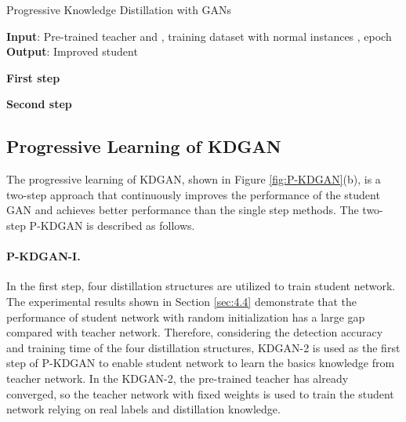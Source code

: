 \documentclass{article}
\begin{document}
	
	
	\begin{algorithm}[tb]
		\caption{Progressive Knowledge Distillation with GANs}
		\label{alg:algorithm}
		
		\textbf{Input}: Pre-trained teacher  and , training dataset with normal instances , epoch   \\
		\textbf{Output}: Improved student 
		
		\begin{algorithmic}[1] \STATE \textbf{First step }
			
			\ENDFOR
			\ENDFOR
			
			\STATE \textbf{Second step}
			\ENDFOR
			\ENDFOR
			
		\end{algorithmic}
	\end{algorithm}
	
	
	
	\subsection{Progressive Learning of KDGAN}
	The progressive learning of KDGAN, shown in Figure \ref{fig:P-KDGAN}(b), is a two-step approach that continuously improves the performance of the student GAN and achieves better performance than the single step methods. The two-step P-KDGAN is described as follows.
	
	\paragraph{P-KDGAN-I.}
	In the first step, four distillation structures are utilized to train student network. The experimental results shown in Section \ref{sec:4.4} demonstrate that the performance of student network with random initialization has a large gap compared with teacher network. Therefore, considering the detection accuracy and training time of the four distillation structures, KDGAN-\normalsize{\textcircled{\footnotesize{2}}} is used as the first step of P-KDGAN to enable student network to learn the basics knowledge from teacher network. In the KDGAN-\normalsize{\textcircled{\footnotesize{2}}}, the pre-trained teacher has already converged, so the teacher network with fixed weights is used to train the student network relying on real labels and distillation knowledge.
	 
\end{document}
